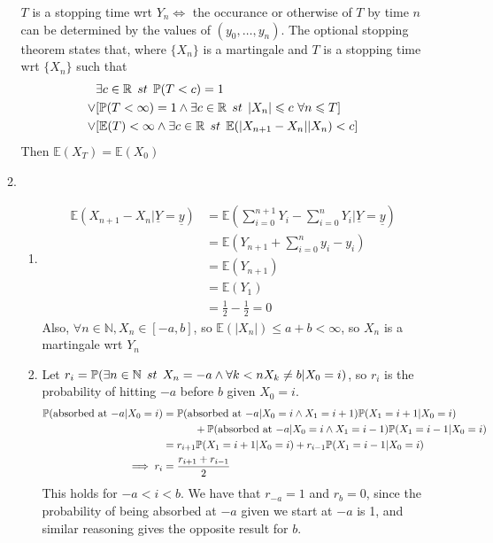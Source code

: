 \documentclass{article}
\begin{document}
\begin{enumerate}
\begin{enumerate}
$T$ is a stopping time wrt ${Y_n}\iff$ the occurance or otherwise of $T$ by time
$n$ can be determined by the values of $(y_0,\dots,y_n)$. The optional stopping
theorem states that, where $\{X_n\}$ is a martingale and $T$ is a stopping time
wrt $\{X_n\}$ such that
\begin{align*}
&\exists c \in \mathbb{R} \,\; st \,\; \mathbb{P}(T<c) = 1\\
\vee &[ \mathbb{P} (T< \infty) =1 \wedge \exists c \in \mathbb{R} \,\; st \,\; |X_n| \leqslant c
\,\,\forall n \leqslant T]\\
\vee &[\mathbb{E}(T) < \infty \wedge \exists c \in \mathbb{R} \,\; st \,\;
\mathbb{E}(|X_{n+1} - X_n| | X_n) < c]
\end{align*}
Then $ \mathbb{E}(X_T) = \mathbb{E}(X_0)$

\item
\begin{enumerate}
\item
\begin{align*}
\mathbb{E}(X_{n+1} - X_n | \underline{Y} = \underline{y}) 
&= \mathbb{E}\left(\sum^{n+1}_{i=0}Y_i - \sum^n_{i=0}Y_i | \underline{Y} =
\underline{y}\right)\\
&= \mathbb{E}\left( Y_{n+1} + \sum^n_{i=0}y_i - y_i\right)\\
&= \mathbb{E}(Y_{n+1})\\
&= \mathbb{E}(Y_1)\\
&= \frac{1}{2} - \frac{1}{2} = 0
\end{align*}
Also, $\forall n \in \mathbb{N}, X_n \in [-a,b]$, so $\mathbb{E}(|X_n|)
\leqslant a+b<\infty$, so $X_n$ is a martingale wrt $Y_n$
\item
Let $r_i = \mathbb{P}(\exists n \in \mathbb{N} \,\; st \,\; X_n = -a \wedge \forall k<n X_k \neq
b | X_0 = i)$, so $r_i$ is the probability of hitting $-a$ before $b$ given $X_0
= i$.
\begin{align*}
\mathbb{P}(\mbox{absorbed at $-a$}|X_0=i) &= 
\mathbb{P}(\mbox{absorbed at $-a$}|X_0=i \wedge X_1 = i+1)\mathbb{P}(X_1=i+1 | X_0 = i) \\
&\quad\quad\quad+ \mathbb{P}(\mbox{absorbed at $-a$}|X_0=i \wedge X_1 = i-1)\mathbb{P}(X_1=i-1
| X_0 = i)\\
&= r_{i+1}\mathbb{P}(X_1=i+1 | X_0 = i)+r_{i-1}\mathbb{P}(X_1=i-1 | X_0 = i)\\
\implies r_i &= \frac{r_{i+1}+r_{i-1}}{2}
\end{align*}
This holds for $-a < i < b$. We have that $r_{-a} =1$ and $r_b = 0$, since the
probability of being absorbed at $-a$ given we start at $-a$ is 1, and similar
reasoning gives the opposite result for $b$.

\end{enumerate}
\end{enumerate}
\end{enumerate}
\end{document}
